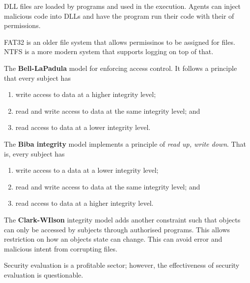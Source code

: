 \begin{example}
    DLL files are loaded by programs and used in the execution. Agents can inject malicious code into DLLs and have the program run their code with their of permissions.
\end{example}

\begin{example}
    FAT32 is an older file system that allows permissinos to be assigned for files. NTFS is a more modern system that supports logging on top of that.
\end{example}

\begin{definition}
    The \textbf{Bell-LaPadula} model for enforcing access control. It follows a principle that every subject has
    \begin{enumerate}
        \item write access to data at a higher integrity level;
        \item read and write access to data at the same integrity level; and
        \item read access to data at a lower integrity level.
    \end{enumerate}
\end{definition}

\begin{definition}
    The \textbf{Biba integrity} model implements a principle of \emph{read up, write down}. That is, every subject has
    \begin{enumerate}
        \item write access to a data at a lower integrity level;
        \item read and write access to data at the same integrity level; and
        \item read access to data at a higher integrity level.
    \end{enumerate}
\end{definition}

\begin{definition}
    The \textbf{Clark-WIlson} integrity model adds another constraint such that objects can only be accessed by subjects through authorised programs. This allows restriction on how an objects state can change. This can avoid error and malicious intent from corrupting files.
\end{definition}

\begin{remark}
    Security evaluation is a profitable sector; however, the effectiveness of security evaluation is questionable.
\end{remark}

